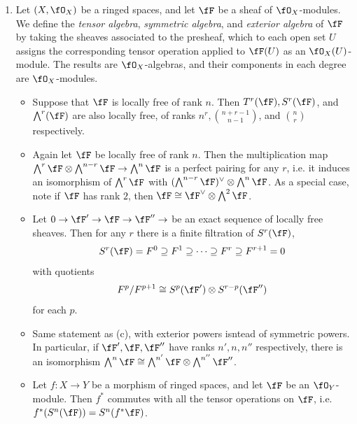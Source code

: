 \documentclass[a4paper]{article}
\begin{document}
\begin{enumerate} [label=\textbf{\arabic*.}, leftmargin=0em]
\item[\textbf{16.}] Let $(X, \fO_X)$ be a ringed spaces, and let $\fF$ be a sheaf of $\fO_X$-modules. We define the \textit{tensor algebra}, \textit{symmetric algebra}, and \textit{exterior algebra} of $\fF$ by taking the sheaves associated to the presheaf, which to each open set $U$ assigns the corresponding tensor operation applied to $\fF(U)$ as an $\fO_X(U)$-module. The results are $\fO_X$-algebras, and their components in each degree are $\fO_X$-modules.
\begin{itemize}
    \item[(a)] Suppose that $\fF$ is locally free of rank $n$. Then $T^r(\fF), S^r(\fF)$, and $\bigwedge^r(\fF)$ are also locally free, of ranks $n^r, \binom{n + r - 1}{n - 1}$, and $\binom{n}{r}$ respectively.
    \item[(b)] Again let $\fF$ be locally free of rank $n$. Then the multiplication map $\bigwedge^r \fF \otimes \bigwedge^{n - r} \fF \to \bigwedge^n \fF$ is a perfect pairing for any $r$, i.e. it induces an isomorphism of $\bigwedge^r \fF$ with $(\bigwedge^{n - r} \fF)^\vee \otimes \bigwedge^n \fF$. As a special case, note if $\fF$ has rank $2$, then $\fF \cong \fF^\vee \otimes \bigwedge^2 \fF$.
    \item[(c)] Let $0 \to \fF' \to \fF \to \fF'' \to $ be an exact sequence of locally free sheaves. Then for any $r$ there is a finite filtration of $S^r(\fF)$,
    \begin{equation*}
        S^r(\fF) = F^0 \supseteq F^1 \supseteq \cdots \supseteq F^r \supseteq F^{r + 1} = 0
    \end{equation*}
    with quotients
    \begin{equation*}
        F^p / F^{p + 1} \cong S^p(\fF') \otimes S^{r - p}(\fF'')
    \end{equation*}
    for each $p$.
    \item[(d)] Same statement as (c), with exterior powers isntead of symmetric powers. In particular, if $\fF', \fF, \fF''$ have ranks $n', n, n''$ respectively, there is an isomorphism $\bigwedge^n \fF \cong \bigwedge^{n'} \fF \otimes \bigwedge^{n''} \fF''$.
    \item[(e)] Let $f : X \to Y$ be a morphism of ringed spaces, and let $\fF$ be an $\fO_Y$-module. Then $f^*$ commutes with all the tensor operations on $\fF$, i.e. $f^*(S^n(\fF)) = S^n(f^* \fF)$.
\end{itemize}


\end{enumerate}
\end{document}
